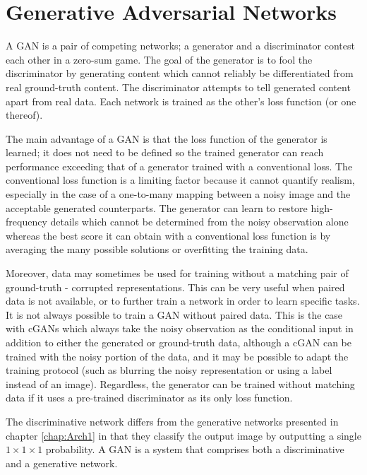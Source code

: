 \chapter{Generative Adversarial Networks}\label{chap:Arch2}

A \acf{GAN} is a pair of competing networks; a generator and a discriminator contest each other in a zero-sum game. The goal of the generator is to fool the discriminator by generating content which cannot reliably be differentiated from real ground-truth content. The discriminator attempts to tell generated content apart from real data. Each network is trained as the other's loss function (or one thereof).

The main advantage of a \ac{GAN} is that the loss function of the generator is learned; it does not need to be defined so the trained generator can reach performance exceeding that of a generator trained with a conventional loss. The conventional loss function is a limiting factor because it cannot quantify realism, especially in the case of a one-to-many mapping between a noisy image and the acceptable generated counterparts. The generator can learn to restore high-frequency details which cannot be determined from the noisy observation alone whereas the best score it can obtain with a conventional loss function is by averaging the many possible solutions or overfitting the training data.

Moreover, data may sometimes be used for training without a matching pair of ground-truth - corrupted representations. This can be very useful when paired data is not available, or to further train a network in order to learn specific tasks. It is not always possible to train a \ac{GAN} without paired data. This is the case with \acsp{cGAN} which always take the noisy observation as the conditional input in addition to either the generated or ground-truth data, although a \ac{cGAN} can be trained with the noisy portion of the data, and it may be possible to adapt the training protocol (such as blurring the noisy representation or using a label instead of an image). Regardless, the generator can be trained without matching data if it uses a pre-trained discriminator as its only loss function.

The discriminative network differs from the generative networks presented in chapter \ref{chap:Arch1} in that they classify the output image by outputting a single $1\times 1 \times 1$ probability. A \ac{GAN} is a system that comprises both a discriminative and a generative network.

